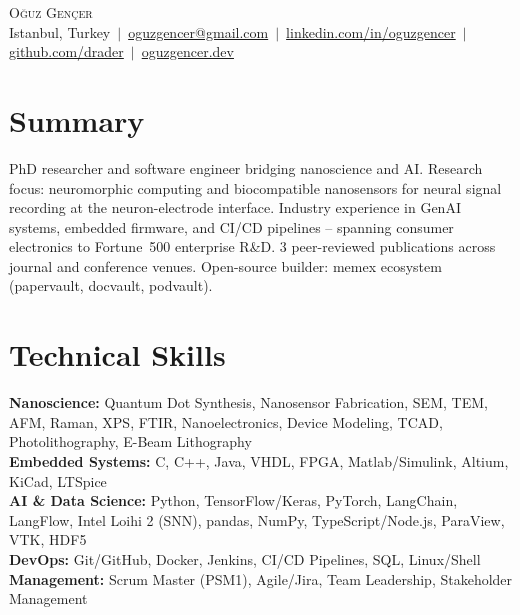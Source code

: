 \documentclass[letterpaper,11pt]{article}
\begin{document}
\begin{center}
  {\Huge \scshape O\u{g}uz Gen\c{c}er} \\[4pt]
  \small
  Istanbul, Turkey \,$|$\,
  \href{mailto:oguzgencer@gmail.com}{oguzgencer@gmail.com} \,$|$\,
  \href{https://linkedin.com/in/oguzgencer}{linkedin.com/in/oguzgencer} \,$|$\,
  \href{https://github.com/drader}{github.com/drader} \,$|$\,
  \href{https://oguzgencer.dev}{oguzgencer.dev}
\end{center}

\section{Summary}
\small{
PhD researcher and software engineer bridging nanoscience and AI. Research focus: neuromorphic computing and biocompatible nanosensors for neural signal recording at the neuron-electrode interface. Industry experience in GenAI systems, embedded firmware, and CI/CD pipelines -- spanning consumer electronics to Fortune~500 enterprise R\&D. 3 peer-reviewed publications across journal and conference venues. Open-source builder: memex ecosystem (papervault, docvault, podvault).
}
\vspace{-4pt}

\section{Technical Skills}
\begin{itemize}[leftmargin=0.15in, label={}]
  \small{\item{
    \textbf{Nanoscience:} Quantum Dot Synthesis, Nanosensor Fabrication, SEM, TEM, AFM, Raman, XPS, FTIR, Nanoelectronics, Device Modeling, TCAD, Photolithography, E-Beam Lithography \\[2pt]
    \textbf{Embedded Systems:} C, C++, Java, VHDL, FPGA, Matlab/Simulink, Altium, KiCad, LTSpice \\[2pt]
    \textbf{AI \& Data Science:} Python, TensorFlow/Keras, PyTorch, LangChain, LangFlow, Intel Loihi 2 (SNN), pandas, NumPy, TypeScript/Node.js, ParaView, VTK, HDF5 \\[2pt]
    \textbf{DevOps:} Git/GitHub, Docker, Jenkins, CI/CD Pipelines, SQL, Linux/Shell \\[2pt]
    \textbf{Management:} Scrum Master (PSM1), Agile/Jira, Team Leadership, Stakeholder Management
  }}
\end{itemize}
\end{document}
